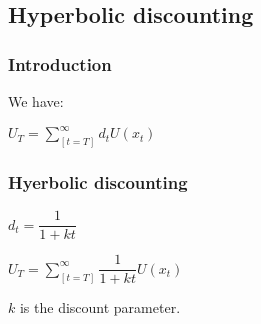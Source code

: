 
\subsection{Hyperbolic discounting}

\subsubsection{Introduction}

We have:

\(U_T=\sum_[t=T]^{\infty }d_tU(x_t)\)

\subsubsection{Hyerbolic discounting}

\(d_t=\dfrac{1}{1+kt}\)

\(U_T=\sum_[t=T]^{\infty }\dfrac{1}{1+kt}U(x_t)\)

\(k\) is the discount parameter.

